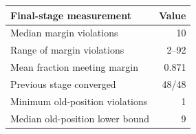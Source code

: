 \begin{tabular}{lr}
\toprule
Final-stage measurement & Value \\
\midrule
Median margin violations & 10 \\
Range of margin violations & 2--92 \\
Mean fraction meeting margin & 0.871 \\
Previous stage converged & 48/48 \\
Minimum old-position violations & 1 \\
Median old-position lower bound & 9 \\
\bottomrule
\end{tabular}
